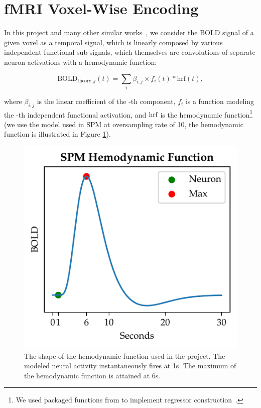 \section{fMRI Voxel-Wise Encoding}


In this project and many other similar works~\parencite{huthNaturalSpeechReveals2016}, we consider the BOLD signal of a given voxel  as a temporal signal, which is linearly composed by various independent functional sub-signals, which themselves are convolutions of separate neuron activations with a hemodynamic function: 

\begin{equation}
    \text{BOLD}_{\text{theory}, j}(t) = \sum_i {\beta_{i,j} \times f_{i}(t) * \text{hrf}(t)},
\label{eqn:boldlinear}
\end{equation}

where \(\beta_{i,j}\) is the linear coefficient of the -th component, \(f_{i}\) is a function modeling the -th independent functional activation, and \(\textnormal{hrf}\) is the hemodynamic function\footnote{We used packaged functions from  to implement regressor construction~\parencite{abrahamMachineLearningNeuroimaging2014}.} (we use the model used in SPM at oversampling rate of 10, the hemodynamic function is illustrated in Figure \ref{fig:hrf}).

\begin{figure}
    \centering
    \includegraphics[scale=.8]{Figures/SPMHDF.pdf}
    \caption[SPM Hemodynamic Function]{The shape of the hemodynamic function used in the project. The modeled neural activity instantaneously fires at 1s. The maximum of the hemodynamic function is attained at 6s.}
    \label{fig:hrf}
\end{figure}


